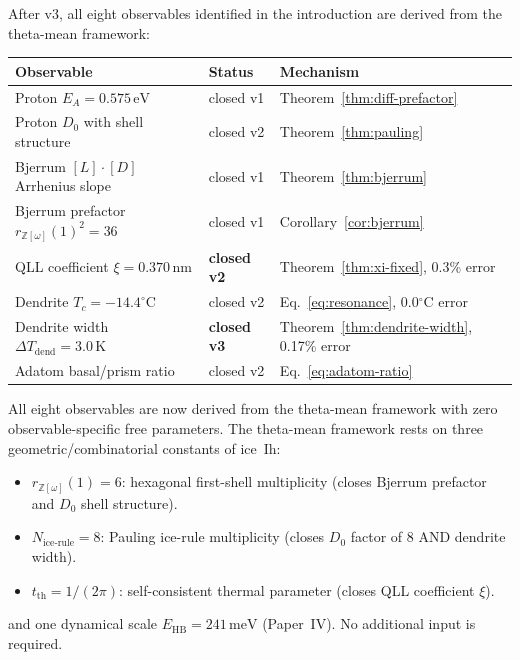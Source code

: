 \documentclass[11pt,letterpaper]{article}
\theoremstyle{plain}
\theoremstyle{definition}
\newcommand{\Eisenstein}{\mathbb{Z}[\omega]}
\begin{document}
After v3, all eight observables identified in the introduction are
derived from the theta-mean framework:
\begin{center}
\begin{tabular}{@{}lll@{}}
\toprule
Observable & Status & Mechanism \\
\midrule
Proton $E_A=0.575\,\mathrm{eV}$ & closed v1 & Theorem~\ref{thm:diff-prefactor} \\
Proton $D_0$ with shell structure & closed v2 & Theorem~\ref{thm:pauling} \\
Bjerrum $[L]\cdot[D]$ Arrhenius slope & closed v1 & Theorem~\ref{thm:bjerrum} \\
Bjerrum prefactor $r_{\Eisenstein}(1)^2=36$ & closed v1 & Corollary~\ref{cor:bjerrum} \\
QLL coefficient $\xi=0.370\,\mathrm{nm}$ & \textbf{closed v2} & Theorem~\ref{thm:xi-fixed}, 0.3\% error \\
Dendrite $T_c=-14.4^{\circ}\mathrm{C}$ & closed v2 & Eq.~\eqref{eq:resonance}, 0.0$^\circ$C error \\
Dendrite width $\Delta T_{\text{dend}}=3.0\,\mathrm{K}$ & \textbf{closed v3} & Theorem~\ref{thm:dendrite-width}, 0.17\% error \\
Adatom basal/prism ratio & closed v2 & Eq.~\eqref{eq:adatom-ratio} \\
\bottomrule
\end{tabular}
\end{center}

All eight observables are now derived from the theta-mean framework
with zero observable-specific free parameters.  The
theta-mean framework rests on three geometric/combinatorial
constants of ice~Ih:
\begin{itemize}[leftmargin=2em,nosep]
\item $r_{\Eisenstein}(1) = 6$: hexagonal first-shell multiplicity
  (closes Bjerrum prefactor and $D_0$ shell structure).
\item $N_{\text{ice-rule}} = 8$: Pauling ice-rule multiplicity
  (closes $D_0$ factor of $8$ AND dendrite width).
\item $t_{\text{th}} = 1/(2\pi)$: self-consistent thermal parameter
  (closes QLL coefficient $\xi$).
\end{itemize}
and one dynamical scale $E_{\text{HB}} = 241\,\mathrm{meV}$ (Paper~IV).
No additional input is required.
\end{document}
